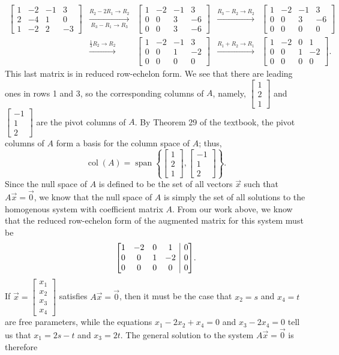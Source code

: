 \documentclass[letterpaper,12pt,reqno]{amsart}
\makeatletter
\newcommand{\bbm}{\begin{bmatrix}}
\newcommand{\ebm}{\end{bmatrix}}
\newenvironment{amatrix}[1]{%
  \left[\begin{array}{@{}*{#1}{c}|c@{}}
}{%
  \end{array}\right]
}
\makeatother
\begin{document}
\begin{enumerate}
\begin{align*}
 \bbm 1&-2&-1&3\\2&-4&1&0\\1&-2&2&-3\ebm & \xrightarrow[R_3-R_1\to R_3]{R_2-2R_1\to R_2}& \bbm 1&-2&-1&3\\0&0&3&-6\\0&0&3&-6\ebm
&\xrightarrow{R_3-R_2\to R_2}& \bbm 1&-2&-1&3\\0&0&3&-6\\0&0&0&0\ebm\\
&\xrightarrow{\frac{1}{3}R_2\to R_2}& \bbm 1&-2&-1&3\\0&0&1&-2\\0&0&0&0\ebm &\xrightarrow{R_1+R_2\to R_1}& \bbm 1&-2&0&1\\0&0&1&-2\\0&0&0&0\ebm.
\end{align*}
This last matrix is in reduced row-echelon form. We see that there are leading ones in rows 1 and 3, so the corresponding columns of $A$, namely, $\bbm 1\\2\\1\ebm$ and $\bbm -1\\1\\2\ebm$ are the pivot columns of $A$. By Theorem 29 of the textbook, the pivot columns of $A$ form a basis for the column space of $A$; thus,
\[
 \operatorname{col}(A) = \operatorname{span}\left\{\bbm 1\\2\\1\ebm, \bbm -1\\1\\2\ebm\right\}.
\]
Since the null space of $A$ is defined to be the set of all vectors $\vec{x}$ such that $A\vec{x}=\vec{0}$, we know that the null space of $A$ is simply the set of all solutions to the homogenous system with coefficient matrix $A$. From our work above, we know that the reduced row-echelon form of the augmented matrix for this system must be
\[
 \begin{amatrix}{4}1&-2&0&1&0\\0&0&1&-2&0\\0&0&0&0&0\end{amatrix}.
\]
If $\vec{x} = \bbm x_1\\x_2\\x_3\\x_4\ebm$ satisfies $A\vec{x}=\vec{0}$, then it must be the case that $x_2=s$ and $x_4=t$ are free parameters, while the equations $x_1-2x_2+x_4=0$ and $x_3-2x_4=0$ tell us that $x_1 = 2s-t$ and $x_3 = 2t$. The general solution to the system $A\vec{x}=\vec{0}$ is therefore

\end{enumerate}
\end{document}
